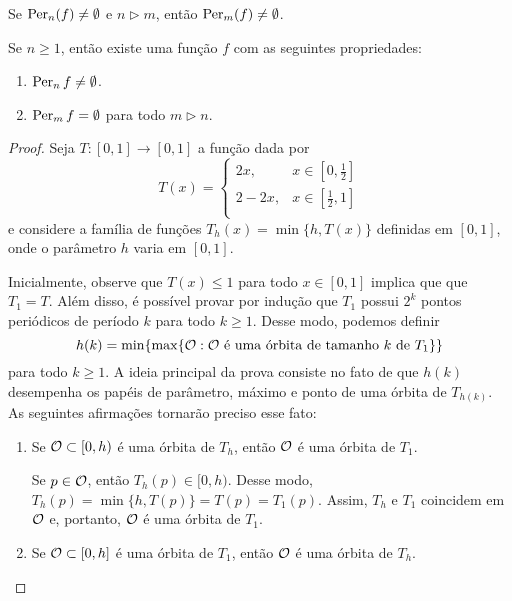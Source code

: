 \begin{theorem}[Sharkovsky]
Se $\operatorname{Per}_n(f) \neq \emptyset$ e $n \triangleright m$, então $\operatorname{Per}_m(f) \neq \emptyset$.
\end{theorem}

\begin{theorem}
Se $n \geq 1$, então existe uma função $f$ com as seguintes propriedades:
\begin{enumerate}
\item $\operatorname{Per}_n{f} \neq \emptyset$.
\item $\operatorname{Per}_m{f} =  \emptyset$ para todo $m \triangleright n$.
\end{enumerate}
\end{theorem}

\begin{proof}
Seja $T: [0,1] \to [0,1]$ a função dada por
\[ T(x) =
  \begin{cases}
    2x, & x \in \left[ 0, \frac{1}{2} \right] \\
    2 - 2x, & x \in \left[ \frac{1}{2}, 1 \right] \\
  \end{cases}
\]
e considere a família de funções $T_h(x) = \min \lbrace h, T(x) \rbrace$ definidas em $[0,1]$, onde o parâmetro $h$ varia em $[0,1]$.

Inicialmente, observe que $T(x) \leq 1$ para todo $x \in [0,1]$ implica que que $T_1 = T$.
Além disso, é possível provar por indução que $T_1$ possui $2^k$ pontos periódicos de período $k$ para todo $k \geq 1$.
Desse modo, podemos definir
$$h(k) = \min \lbrace \max \lbrace \mathcal{O} : \mathcal{O} \text{ é uma órbita de tamanho } k \text{ de } T_1 \rbrace \rbrace$$
para todo $k \geq 1$.
A ideia principal da prova consiste no fato de que $h(k)$ desempenha os papéis de parâmetro, máximo e ponto de uma órbita de $T_{h(k)}$. As seguintes afirmações tornarão preciso esse fato:

\begin{enumerate}[label=\alph*)]
\item Se $\mathcal{O} \subset [0, h)$ é uma órbita de $T_h$, então $\mathcal{O}$ é uma órbita de $T_1$.

Se $p \in \mathcal{O}$, então $T_h(p) \in [0, h)$.
Desse modo, $T_h(p) = \min \lbrace h, T(p) \rbrace = T(p) = T_1(p)$.
Assim, $T_h$ e $T_1$ coincidem em $\mathcal{O}$ e, portanto, $\mathcal{O}$ é uma órbita de $T_1$.

\item Se $\mathcal{O} \subset [0, h]$ é uma órbita de $T_1$, então $\mathcal{O}$ é uma órbita de $T_h$.


\end{enumerate}
\end{proof}
